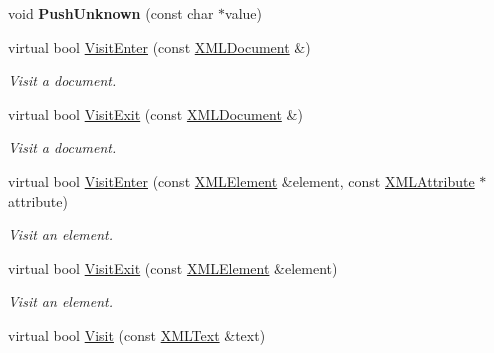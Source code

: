 \begin{DoxyCompactItemize}
\item 
void {\bfseries Push\+Unknown} (const char $\ast$value)\hypertarget{classtinyxml2_1_1XMLPrinter_ab1efc6d1548505e9984185f58f54b713}{}\label{classtinyxml2_1_1XMLPrinter_ab1efc6d1548505e9984185f58f54b713}

\item 
virtual bool \hyperlink{classtinyxml2_1_1XMLPrinter_a9aa1de11a55a07db55a90fde37d7afad}{Visit\+Enter} (const \hyperlink{classtinyxml2_1_1XMLDocument}{X\+M\+L\+Document} \&)\hypertarget{classtinyxml2_1_1XMLPrinter_a9aa1de11a55a07db55a90fde37d7afad}{}\label{classtinyxml2_1_1XMLPrinter_a9aa1de11a55a07db55a90fde37d7afad}

\begin{DoxyCompactList}\small\item\em Visit a document. \end{DoxyCompactList}\item 
virtual bool \hyperlink{classtinyxml2_1_1XMLPrinter_a15fc1f2b922f540917dcf52808737b29}{Visit\+Exit} (const \hyperlink{classtinyxml2_1_1XMLDocument}{X\+M\+L\+Document} \&)\hypertarget{classtinyxml2_1_1XMLPrinter_a15fc1f2b922f540917dcf52808737b29}{}\label{classtinyxml2_1_1XMLPrinter_a15fc1f2b922f540917dcf52808737b29}

\begin{DoxyCompactList}\small\item\em Visit a document. \end{DoxyCompactList}\item 
virtual bool \hyperlink{classtinyxml2_1_1XMLPrinter_a169b2509d8eabb70811b2bb8cfd1f5d1}{Visit\+Enter} (const \hyperlink{classtinyxml2_1_1XMLElement}{X\+M\+L\+Element} \&element, const \hyperlink{classtinyxml2_1_1XMLAttribute}{X\+M\+L\+Attribute} $\ast$attribute)\hypertarget{classtinyxml2_1_1XMLPrinter_a169b2509d8eabb70811b2bb8cfd1f5d1}{}\label{classtinyxml2_1_1XMLPrinter_a169b2509d8eabb70811b2bb8cfd1f5d1}

\begin{DoxyCompactList}\small\item\em Visit an element. \end{DoxyCompactList}\item 
virtual bool \hyperlink{classtinyxml2_1_1XMLPrinter_a2edd48405971a88951c71c9df86a2f50}{Visit\+Exit} (const \hyperlink{classtinyxml2_1_1XMLElement}{X\+M\+L\+Element} \&element)\hypertarget{classtinyxml2_1_1XMLPrinter_a2edd48405971a88951c71c9df86a2f50}{}\label{classtinyxml2_1_1XMLPrinter_a2edd48405971a88951c71c9df86a2f50}

\begin{DoxyCompactList}\small\item\em Visit an element. \end{DoxyCompactList}\item 
virtual bool \hyperlink{classtinyxml2_1_1XMLPrinter_adc0e42b4f6fcb90a95630c79575d030b}{Visit} (const \hyperlink{classtinyxml2_1_1XMLText}{X\+M\+L\+Text} \&text)\hypertarget{classtinyxml2_1_1XMLPrinter_adc0e42b4f6fcb90a95630c79575d030b}{}\label{classtinyxml2_1_1XMLPrinter_adc0e42b4f6fcb90a95630c79575d030b}


\end{DoxyCompactItemize}
